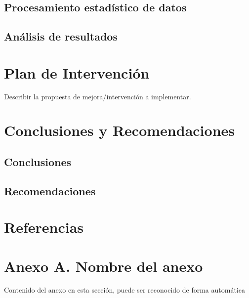 \documentclass[12pt]{article}
\newcommand{\chapterbreak}{\clearpage \thispagestyle{fancy}}
\begin{document}
\subsection*{Procesamiento estadístico de datos}
\subsection*{Análisis de resultados}

\chapterbreak
\section{Plan de Intervención}
Describir la propuesta de mejora/intervención a implementar.

\chapterbreak
\section{Conclusiones y Recomendaciones}
\subsection*{Conclusiones}
\subsection*{Recomendaciones}

\chapterbreak
\section*{Referencias}
\printbibliography[heading=bibintoc]

\chapterbreak
\appendix
\section*{Anexo A. Nombre del anexo}
Contenido del anexo en esta sección, puede ser reconocido de forma automática
\end{document}
